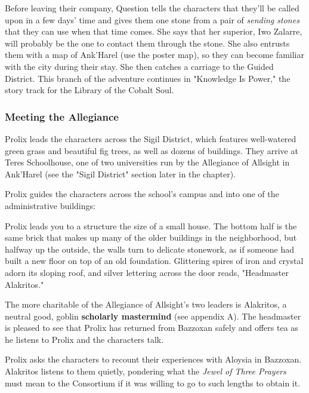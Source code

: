 \documentclass[10pt,a4paper,twoside,bg=print,twocolumn,openany,nodeprecatedcode]{dndbook}
\begin{document}
Before leaving their company, Question tells the characters that they'll be called upon in a few days' time and gives them one stone from a pair of \textit{sending stones} that they can use when that time comes. She says that her superior, Iwo Zalarre, will probably be the one to contact them through the stone. She also entrusts them with a map of Ank'Harel (use the poster map), so they can become familiar with the city during their stay. She then catches a carriage to the Guided District. This branch of the adventure continues in "Knowledge Is Power," the story track for the Library of the Cobalt Soul.

\subsubsection{Meeting the Allegiance}
Prolix leads the characters across the Sigil District, which features well-watered green grass and beautiful fig trees, as well as dozens of buildings. They arrive at Teres Schoolhouse, one of two universities run by the Allegiance of Allsight in Ank'Harel (see the "Sigil District" section later in the chapter).

Prolix guides the characters across the school's campus and into one of the administrative buildings:

\begin{DndReadAloud}{}
Prolix leads you to a structure the size of a small house. The bottom half is the same brick that makes up many of the older buildings in the neighborhood, but halfway up the outside, the walls turn to delicate stonework, as if someone had built a new floor on top of an old foundation. Glittering spires of iron and crystal adorn its sloping roof, and silver lettering across the door reads, "Headmaster Alakritos."

\end{DndReadAloud}

The more charitable of the Allegiance of Allsight's two leaders is Alakritos, a neutral good, goblin \textbf{scholarly mastermind} (see appendix A). The headmaster is pleased to see that Prolix has returned from Bazzoxan safely and offers tea as he listens to Prolix and the characters talk.

Prolix asks the characters to recount their experiences with Aloysia in Bazzoxan. Alakritos listens to them quietly, pondering what the \textit{Jewel of Three Prayers} must mean to the Consortium if it was willing to go to such lengths to obtain it.
\end{document}
